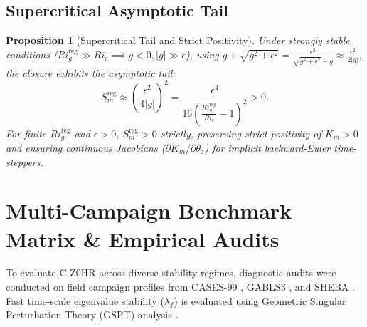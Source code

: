 \documentclass[11pt,a4paper]{article}
\newtheorem{proposition}{Proposition}
\begin{document}
\subsection{Supercritical Asymptotic Tail}

\begin{proposition}[Supercritical Tail and Strict Positivity]
Under strongly stable conditions ($Ri_g^{\text{reg}} \gg Ri_c \implies g < 0, |g| \gg \epsilon$), using $g + \sqrt{g^2+\epsilon^2} = \frac{\epsilon^2}{\sqrt{g^2+\epsilon^2}-g} \approx \frac{\epsilon^2}{2|g|}$, the closure exhibits the asymptotic tail:
\begin{equation}
S_m^{\text{reg}} \approx \left( \frac{\epsilon^2}{4 |g|} \right)^2 = \frac{\epsilon^4}{16 \left( \frac{Ri_g^{\text{reg}}}{Ri_c} - 1 \right)^2} > 0.
\end{equation}
For finite $Ri_g^{\text{reg}}$ and $\epsilon > 0$, $S_m^{\text{reg}} > 0$ strictly, preserving strict positivity of $K_m > 0$ and ensuring continuous Jacobians ($\partial K_m / \partial \theta_z$) for implicit backward-Euler time-steppers.
\end{proposition}

\section{Multi-Campaign Benchmark Matrix \& Empirical Audits}

To evaluate C-Z0HR across diverse stability regimes, diagnostic audits were conducted on field campaign profiles from CASES-99 \citep{poulos2002cases, banta2007very}, GABLS3 \citep{bosveld2014third}, and SHEBA \citep{uttal2002surface, grachev2007sheba}. Fast time-scale eigenvalue stability ($\lambda_f$) is evaluated using Geometric Singular Perturbation Theory (GSPT) analysis \citep{fenichel1979geometric, kuehn2015multiple}.
\end{document}
